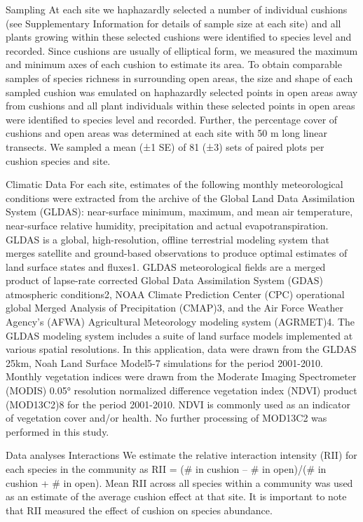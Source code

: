 \documentclass[12pt]{article}
\begin{document}
Sampling 
At each site we haphazardly selected a number of individual cushions
(see Supplementary Information for details of sample size at each
site) and all plants growing within these selected cushions were
identified to species level and recorded. Since cushions are usually
of elliptical form, we measured the maximum and minimum axes of each
cushion to estimate its area. To obtain comparable samples of species
richness in surrounding open areas, the size and shape of each sampled
cushion was emulated on haphazardly selected points in open areas away
from cushions and all plant individuals within these selected points
in open areas were identified to species level and recorded. Further,
the percentage cover of cushions and open areas was determined at each
site with 50 m long linear transects. We sampled a mean (±1 SE) of 81
(±3) sets of paired plots per cushion species and site. 

Climatic Data
For each site, estimates of the following monthly meteorological
conditions were extracted from the archive of the Global Land Data
Assimilation System (GLDAS): near-surface minimum, maximum, and mean
air temperature, near-surface relative humidity, precipitation and
actual evapotranspiration. GLDAS is a global, high-resolution, offline
terrestrial modeling system that merges satellite and ground-based
observations to produce optimal estimates of land surface states and
fluxes1. GLDAS meteorological fields are a merged product of
lapse-rate corrected Global Data Assimilation System (GDAS)
atmospheric conditions2, NOAA Climate Prediction Center (CPC)
operational global Merged Analysis of Precipitation (CMAP)3, and the
Air Force Weather Agency’s (AFWA) Agricultural Meteorology modeling
system (AGRMET)4. The GLDAS modeling system includes a suite of land
surface models implemented at various spatial resolutions. In this
application, data were drawn from the GLDAS 25km, Noah Land Surface
Model5-7 simulations for the period 2001-2010.
Monthly vegetation indices were drawn from the Moderate Imaging
Spectrometer (MODIS) 0.05° resolution normalized difference vegetation
index (NDVI) product (MOD13C2)8 for the period 2001-2010. NDVI is
commonly used as an indicator of vegetation cover and/or health. No
further processing of MOD13C2 was performed in this study.

Data analyses 
Interactions
We estimate the relative interaction intensity (RII) for each species
in the community as RII = (# in cushion – # in open)/(# in cushion + #
in open). Mean RII across all species within a community was used as
an estimate of the average cushion effect at that site. It is
important to note that RII measured the effect of cushion on species
abundance.
\end{document}
